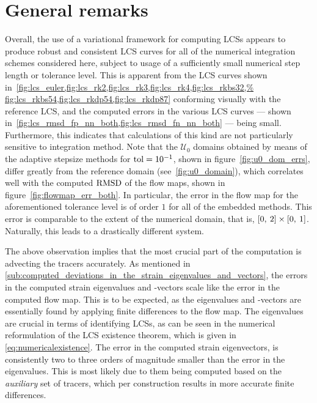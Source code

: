 \section{General remarks}
\label{sec:general_remarks}

Overall, the use of a variational framework for computing LCSs appears to
produce robust and consistent LCS curves for all of the numerical integration
schemes considered here, subject to usage of a sufficiently small numerical
step length or tolerance level. This is apparent from the LCS curves shown
in~\cref{fig:lcs_euler,fig:lcs_rk2,fig:lcs_rk3,fig:lcs_rk4,fig:lcs_rkbs32,%
fig:lcs_rkbs54,fig:lcs_rkdp54,fig:lcs_rkdp87} conforming visually with the
reference LCS, and the computed errors in the various LCS curves --- shown
in~\cref{fig:lcs_rmsd_fp_nn_both,fig:lcs_rmsd_fn_nn_both} --- being small.
Furthermore, this indicates that calculations of this kind
are not particularly sensitive to integration method. Note that the
$\mathcal{U}_{0}$ domains obtained by means of the adaptive stepsize methods
for $\textnormal{tol}=10^{-1}$, shown in figure~\ref{fig:u0_dom_errs}, differ
greatly from the reference domain (see~\cref{fig:u0_domain}), which correlates
well with the computed $\operatorname{RMSD}$ of the flow maps, shown in
figure~\ref{fig:flowmap_err_both}. In particular, the error in the flow map for
the aforementioned tolerance level is of order $1$ for all of the embedded
methods. This error is comparable to the extent of the numerical domain, that
is, $[0,\hspace{0.5ex}2]\times[0,\hspace{0.5ex}1]$. Naturally, this leads to a
drastically different system.

The above observation implies that the most crucial part of the computation is
advecting the tracers accurately. As mentioned in
\cref{sub:computed_deviations_in_the_strain_eigenvalues_and_vectors}, the errors
in the computed strain eigenvalues and -vectors scale like the error in the
computed flow map. This is to be expected, as the eigenvalues and -vectors are
essentially found by applying finite differences to the flow map. The
eigenvalues are crucial in terms of identifying LCSs, as can be seen in the
numerical reformulation of the LCS existence theorem, which is given in
\cref{eq:numericalexistence}. The error in the computed strain eigenvectors, is
consistently two to three orders of magnitude smaller than the error in the
eigenvalues. This is most likely due to them being computed based on the %
\emph{auxiliary} set of tracers, which per construction results in more accurate
finite differences.

